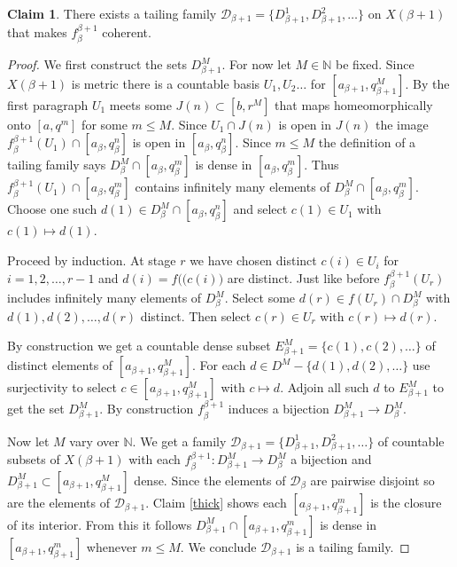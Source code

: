 \documentclass[12pt]{article}
\theoremstyle{plain}
\theoremstyle{definition}
\newcounter{claim5counter}
\newtheorem{claim5}[claim5counter]{Claim}
\newcommand{\B}{\ensuremath{\beta}}
\newcommand{\NN}{\ensuremath{\mathbb N}}
\newcommand{\0}{\ensuremath{\varnothing}}
\newcommand{\cD}{\ensuremath{\mathcal D}}
\begin{document}
	\begin{claim5}
		There exists a tailing family $\cD_{\B+1} = \{D_{\B+1}^1, D_{\B+1}^2 , \ldots \}$ on $X(\B+1)$ that makes $f^{\B+1}_\B$ coherent.
	\end{claim5}
	
	\begin{proof}
		
		We first construct the sets $D^M_{\B+1}$.
		For now let $M \in \NN$ be fixed.
		Since $X(\B+1)$ is metric there is a countable basis $U_1,U_2 \ldots$ for $[a_{\B+1},q_{\B+1}^M]$.
		By the first paragraph $U_1$ meets some $J(n) \subset [b,r^M]$ that maps homeomorphically onto $[a,q^m]$ for some $m \le M$.
		Since $U_1 \cap J(n)$ is open in $J(n)$ the image $f^{\B+1}_\B(U_1) \cap [a_\B,q^n_\B]$ is open in $[a_\B,q^n_\B]$.
		Since $m \le M$ the definition of a tailing family says $D^M_\B \cap [a_\B,q^m_\B]$ is dense in $[a_\B,q^m_\B]$.
		Thus $f^{\B+1}_\B(U_1) \cap [a_\B,q^m_\B]$ contains infinitely many elements of $D^M_\B \cap [a_\B,q^m_\B]$.
		Choose one such $d(1) \in D^M_\B \cap [a_\B,q^n_\B]$ and select $c(1) \in U_1$ with $c(1)  \mapsto d(1)$.
		
		
		Proceed by induction.
		At stage $r$ we have chosen distinct $c(i) \in U_i$ for $i=1,2,\ldots, r-1$ and $d(i) = f\big ((c(i) \big)$ are distinct.
		Just like before $f^{\B+1}_\B(U_r)$ includes infinitely many elements of $D^M_\B$. 
		Select some $d(r) \in f(U_r) \cap D^M_\B$ with $d(1),d(2), \ldots , d(r)$ distinct.
		Then select $c(r) \in U_r$ with $c(r)  \mapsto d(r) $.
		
		By construction we get a countable dense subset $E^M_{\B+1} = \{c(1),c(2),\ldots\}$ of distinct elements of $[a_{\B+1},q_{\B+1}^M]$.
		For each $d \in D^M - \{d(1),d(2),\ldots\}$
		use surjectivity to select $c \in [a_{\B+1},q^M_{\B+1}]$ with $c \mapsto d$. Adjoin all such $d$ to $E^M_{\B+1}$ to get the set $D^M_{\B+1}$.
		By construction $f^{\B+1}_\B$ induces a bijection \mbox{$D^M_{\B+1} \to D^M_\B$}.
		
		Now let $M$ vary over $\NN$.
		We get a family $\cD_{\B+1} = \{D^1_{\B+1},D^2_{\B+1}, \ldots\}$ of countable subsets of $X(\B+1)$ 
		with each $f^{\B+1}_\B:D^M_{\B+1} \to D^M_\B$ a bijection and $D^M_{\B+1} \subset [a_{\B+1},q_{\B+1}^M]$ dense.
		Since the elements of $\cD_\B$ are pairwise disjoint so are the elements of $\cD_{\B+1}$. 
		Claim \ref{thick} shows each $[a_{\B+1},q^m_{\B+1}]$ is the closure of its interior. From this it follows $D^M_{\B+1} \cap [a_{\B+1},q^m_{\B+1}]$ is dense in $ [a_{\B+1},q^m_{\B+1}]$ whenever $m \le M$. We conclude $\cD_{\B+1}$ is a tailing family.
		

\end{proof}
\end{document}
